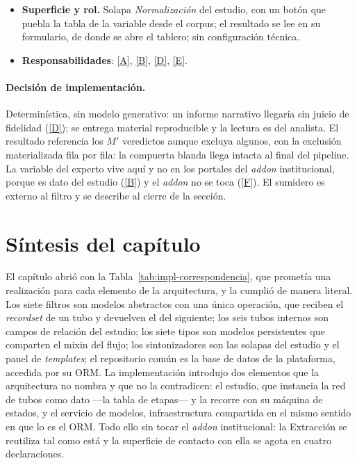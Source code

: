 \documentclass[12pt]{report}
\DeclareRobustCommand{\resp}[1]{\hyperref[tab:registro-responsabilidades]{\textcolor{respcolor}{[#1]}}}
\begin{document}
\begin{itemize}
  \item \textbf{Superficie y rol.} Solapa \textit{Normalización} del estudio, con un botón que puebla la tabla de la variable desde el corpus; el resultado se lee en su formulario, de donde se abre el tablero; sin configuración técnica.
  \item \textbf{Responsabilidades}: \resp{A}, \resp{B}, \resp{D}, \resp{E}.
\end{itemize}

\paragraph{Decisión de implementación.} Determinística, sin modelo generativo: un informe narrativo llegaría sin juicio de fidelidad (\resp{D}); se entrega material reproducible y la lectura es del analista. El resultado referencia los \(M'\) veredictos aunque excluya algunos, con la exclusión materializada fila por fila: la compuerta blanda llega intacta al final del pipeline. La variable del experto vive aquí y no en los portales del \textit{addon} institucional, porque es dato del estudio (\resp{B}) y el \textit{addon} no se toca (\resp{F}). El sumidero es externo al filtro y se describe al cierre de la sección.


\section{Síntesis del capítulo}
\label{sec:impl-sintesis}

El capítulo abrió con la Tabla~\ref{tab:impl-correspondencia}, que prometía una realización para cada elemento de la arquitectura, y la cumplió de manera literal. Los siete filtros son modelos abstractos con una única operación, que reciben el \textit{recordset} de un tubo y devuelven el del siguiente; los seis tubos internos son campos de relación del estudio; los siete tipos son modelos persistentes que comparten el mixin del flujo; los sintonizadores son las solapas del estudio y el panel de \textit{templates}; el repositorio común es la base de datos de la plataforma, accedida por su ORM. La implementación introdujo dos elementos que la arquitectura no nombra y que no la contradicen: el estudio, que instancia la red de tubos como dato ---la tabla de etapas--- y la recorre con su máquina de estados, y el servicio de modelos, infraestructura compartida en el mismo sentido en que lo es el ORM. Todo ello sin tocar el \textit{addon} institucional: la Extracción se reutiliza tal como está y la superficie de contacto con ella se agota en cuatro declaraciones.
\end{document}
